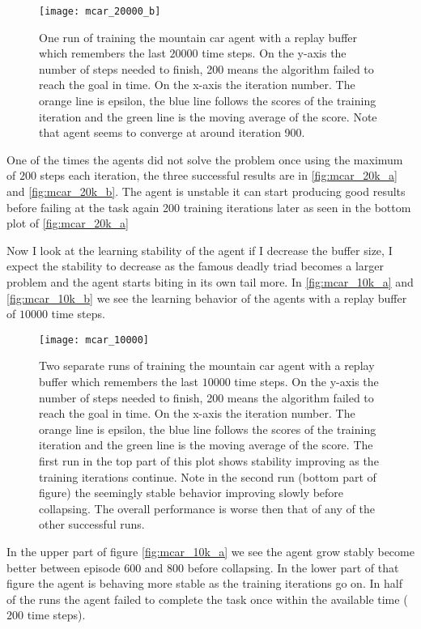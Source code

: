 \begin{figure}
    \texttt{[image: mcar\_20000\_b]}
    \caption{One run of training the mountain car agent with a replay buffer which remembers the last $20000$ time steps. On the y-axis the number of steps needed to finish, 200 means the algorithm failed to reach the goal in time. On the x-axis the iteration number. The orange line is epsilon, the blue line follows the scores of the training iteration and the green line is the moving average of the score. Note that agent seems to converge at around iteration 900.}
    \label{fig:mcar_20k_b}
\end{figure}

One of the times the agents did not solve the problem once using the maximum of $200$ steps each iteration, the three successful results are in \autoref{fig:mcar_20k_a} and \autoref{fig:mcar_20k_b}. The agent is unstable it can start producing good results before failing at the task again 200 training iterations later as seen in the bottom plot of \autoref{fig:mcar_20k_a}

Now I look at the learning stability of the agent if I decrease the buffer size, I expect the stability to decrease as the famous deadly triad becomes a larger problem and the agent starts biting in its own tail more. In \autoref{fig:mcar_10k_a} and \autoref{fig:mcar_10k_b} we see the learning behavior of the agents with a replay buffer of $10 000$ time steps.

\begin{figure}
    \texttt{[image: mcar\_10000]}
    \caption{Two separate runs of training the mountain car agent with a replay buffer which remembers the last $10000$ time steps. On the y-axis the number of steps needed to finish, 200 means the algorithm failed to reach the goal in time. On the x-axis the iteration number. The orange line is epsilon, the blue line follows the scores of the training iteration and the green line is the moving average of the score. The first run in the top part of this plot shows stability improving as the training iterations continue. Note in the second run (bottom part of figure) the seemingly stable behavior improving slowly   before collapsing. The overall performance is worse then that of any of the other successful runs.}
    \label{fig:mcar_10k_a}
\end{figure}

In the upper part of figure \autoref{fig:mcar_10k_a} we see the agent grow stably become better between episode 600 and 800 before collapsing. In the lower part of that figure the agent is behaving more stable as the training iterations go on. In half of the runs the agent failed to complete the task once within the available time ($200$ time steps).

